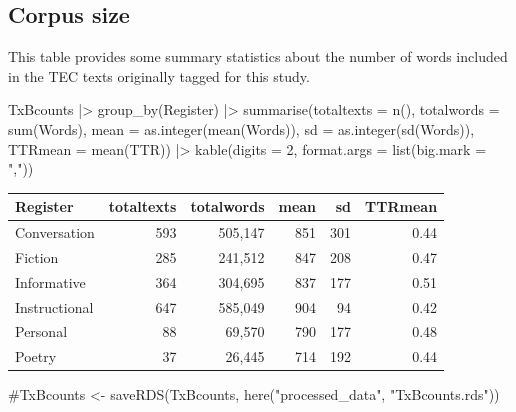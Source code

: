 \documentclass[
  letterpaper,
  DIV=11,
  numbers=noendperiod]{scrreprt}
\newenvironment{Shaded}{\begin{snugshade}}{\end{snugshade}}
\newcommand{\AttributeTok}[1]{\textcolor[rgb]{0.40,0.45,0.13}{#1}}
\newcommand{\CommentTok}[1]{\textcolor[rgb]{0.37,0.37,0.37}{#1}}
\newcommand{\DecValTok}[1]{\textcolor[rgb]{0.68,0.00,0.00}{#1}}
\newcommand{\FunctionTok}[1]{\textcolor[rgb]{0.28,0.35,0.67}{#1}}
\newcommand{\NormalTok}[1]{\textcolor[rgb]{0.00,0.23,0.31}{#1}}
\newcommand{\SpecialCharTok}[1]{\textcolor[rgb]{0.37,0.37,0.37}{#1}}
\newcommand{\StringTok}[1]{\textcolor[rgb]{0.13,0.47,0.30}{#1}}
\begin{document}
\subsection{Corpus size}\label{corpus-size}

This table provides some summary statistics about the number of words
included in the TEC texts originally tagged for this study.

\begin{Shaded}
\begin{Highlighting}[]
\NormalTok{TxBcounts  }\SpecialCharTok{|\textgreater{}}  
  \FunctionTok{group\_by}\NormalTok{(Register) }\SpecialCharTok{|\textgreater{}}  
  \FunctionTok{summarise}\NormalTok{(}\AttributeTok{totaltexts =} \FunctionTok{n}\NormalTok{(), }\AttributeTok{totalwords =} \FunctionTok{sum}\NormalTok{(Words), }\AttributeTok{mean =} \FunctionTok{as.integer}\NormalTok{(}\FunctionTok{mean}\NormalTok{(Words)), }\AttributeTok{sd =} \FunctionTok{as.integer}\NormalTok{(}\FunctionTok{sd}\NormalTok{(Words)), }\AttributeTok{TTRmean =} \FunctionTok{mean}\NormalTok{(TTR)) }\SpecialCharTok{|\textgreater{}}  
  \FunctionTok{kable}\NormalTok{(}\AttributeTok{digits =} \DecValTok{2}\NormalTok{, }\AttributeTok{format.args =} \FunctionTok{list}\NormalTok{(}\AttributeTok{big.mark =} \StringTok{","}\NormalTok{))}
\end{Highlighting}
\end{Shaded}

\begin{longtable}[]{@{}lrrrrr@{}}
\toprule\noalign{}
Register & totaltexts & totalwords & mean & sd & TTRmean \\
\midrule\noalign{}
\endhead
\bottomrule\noalign{}
\endlastfoot
Conversation & 593 & 505,147 & 851 & 301 & 0.44 \\
Fiction & 285 & 241,512 & 847 & 208 & 0.47 \\
Informative & 364 & 304,695 & 837 & 177 & 0.51 \\
Instructional & 647 & 585,049 & 904 & 94 & 0.42 \\
Personal & 88 & 69,570 & 790 & 177 & 0.48 \\
Poetry & 37 & 26,445 & 714 & 192 & 0.44 \\
\end{longtable}

\begin{Shaded}
\begin{Highlighting}[]
\CommentTok{\#TxBcounts \textless{}{-} saveRDS(TxBcounts, here("processed\_data", "TxBcounts.rds"))}
\end{Highlighting}
\end{Shaded}
\end{document}
